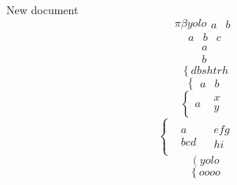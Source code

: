 \documentclass{article}
\begin{document}
New document
\begin{equation}  \pi  \beta  yolo\left.\begin{array}{ll}a&b\end{array}\right. \end{equation}
\begin{equation}     \left.\begin{array}{lll}a&b&c\end{array}\right.     \end{equation}
\begin{equation}     \left.\begin{array}{ll}a\\b\end{array}\right.     \end{equation}
\begin{equation}     \left\{dbshtrh \right.     \end{equation}
\begin{equation}     \left\{\left.\begin{array}{ll}a&b\end{array}\right. \right.     \end{equation}
\begin{equation}     \left\{\left.\begin{array}{ll}a&\left.\begin{array}{ll}x\\y\end{array}\right.\end{array}\right. \right.     \end{equation}
\begin{equation}     \left\{\left.\begin{array}{ll}\left.\begin{array}{ll}\left.\begin{array}{ll}a\\bcd\end{array}\right.&\left.\begin{array}{ll}efg\\hi\end{array}\right.\end{array}\right.&\end{array}\right. \right.     \end{equation}
\begin{equation}    \left({yolo}\right.    \end{equation}
\begin{equation}  \left\lbrace{oooo}\right.  \end{equation}
\end{document}
